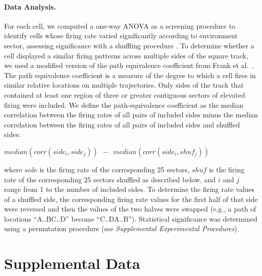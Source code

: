 \paragraph{Data Analysis.}
For each cell, we computed a one-way ANOVA as a screening procedure to identify cells whose firing rate varied significantly according to environment sector, assessing significance with a shuffling procedure \cite{EkstEtal03}. 
To determine whether a cell displayed a similar firing patterns across multiple sides of the square track, we used a modified version of the path equivalence coefficient from Frank et al.\ \citep{FranEtal00}. The path equivalence coefficient is a measure of the degree to which a cell fires in similar relative locations on multiple trajectories. Only sides of the track that contained at least one region of three or greater contiguous sectors of elevated firing were included.  We define the path-equivalence coefficient as the median correlation between the firing rates of all pairs of included sides minus the median correlation between the firing rates of all pairs of included sides and shuffled sides:

\(median(corr(side_{i},side_{j})) ~~ - ~~ median(corr(side_{i},shuf_{j}))\)

where $side$ is the firing rate of the corresponding 25 sectors, $shuf$ is the firing rate of the corresponding 25 sectors shuffled as described below, and $i$ and $j$ range from 1 to the number of included sides. To determine the firing rate values of a  shuffled side, the corresponding  firing rate values for the first half of that side were reversed and then the values of the two halves were swapped (e.g., a path of locations   ``A..BC..D''  become ``C..DA..B''). Statistical significance was determined using a permutation procedure (see \emph{Supplemental Experimental Procedures}).

\section{Supplemental Data}


